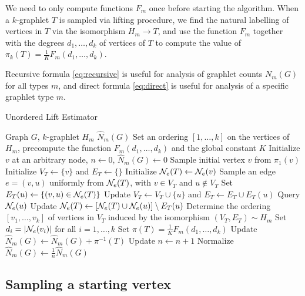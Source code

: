 	We need to only compute functions $F_m$ once before starting the algorithm.
	When a $k$-graphlet $T$ is sampled via lifting procedure, we find the natural labelling of vertices in $T$ via the isomorphism $H_m \rightarrow T$, and use the function $F_m$ together with the degrees $d_1,\ldots,d_k$ of vertices of $T$ to compute the value of 
	$\pi_k(T) = \frac{1}{K} F_{m}(d_1,\ldots,d_k)$.
	
	Recursive formula \eqref{eq:recursive} is useful for analysis of graphlet counts $N_m(G)$ for all types $m$, and direct formula \eqref{eq:direct} is useful for analysis of a specific graphlet type $m$.
	
\begin{algorithm}[h]
\label{alg:ULE}
\caption{Unordered Lift Estimator}
\begin{algorithmic}
    \INPUT Graph $G$, $k$-graphlet $H_m$
    \OUTPUT $\hat N_m(G)$
    \STATE Set an ordering $[1,\ldots, k]$ on the vertices of $H_m$, precompute the function $F_m(d_1,\ldots, d_k)$ and the global constant $K$
    \STATE Initialize $v$ at an arbitrary node, $n \gets 0$, $\hat N_m(G) \gets 0$
        \STATE Sample initial vertex $v$ from $\pi_1(v)$
        \STATE Initialize $V_T \gets \{v\}$ and $E_T \gets \{\}$
        \STATE Initialize $\mathcal{N}_e(T)\gets \mathcal{N}_e(v)$
            \STATE Sample an edge $e=(v,u)$ uniformly from $\mathcal{N}_e(T)$, with $v\in V_T$ and $u\notin V_T$
            \STATE Set $E_T(u) \gets \{(v,u)\in \mathcal{N}_e(T)\}$
            \STATE Update $V_T\gets V_T\cup\{u\}$ and $E_T \gets E_T \cup E_T(u)$
            \STATE Query $\mathcal{N}_e(u)$
            \STATE Update $\mathcal{N}_e(T) \gets [\mathcal{N}_e(T)\cup\mathcal{N}_e(u)]\setminus E_T(u)$
        \ENDWHILE
            \STATE Determine the ordering $[v_1,\ldots,v_k]$ of vertices in $V_T$ induced by the isomorphism $(V_T, E_T)\sim H_m$
            \STATE Set $d_i = |\mathcal{N}_e(v_i)|$ for all $i=1,\ldots, k$
            \STATE Set $\pi(T) = \frac{1}{K}F_m(d_1,\ldots,d_k)$
            \STATE Update $\hat N_m(G) \gets \hat N_m(G) + \pi^{-1}(T)$
        \ENDIF
       \STATE Update $n \gets n + 1$
    \ENDWHILE
    \STATE Normalize $\hat N_m(G) \gets \frac{1}{n}\hat N_m(G)$
\end{algorithmic}
\end{algorithm}

	\subsection{Sampling a starting vertex}
	
